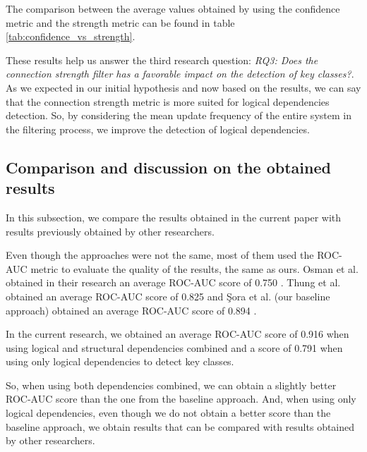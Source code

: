 \documentclass[runningheads]{comsis2}
\begin{document}
The comparison between the average values obtained by using the confidence metric and the strength metric can be found in table \ref{tab:confidence_vs_strength}.

These results help us answer the third research question: \textit{RQ3: Does the connection strength filter has a favorable impact on the detection of key classes?}. As we expected in our initial hypothesis and now based on the results, we can say that the connection strength metric is more suited for logical dependencies detection. So, by considering the mean update frequency of the entire system in the filtering process, we improve the detection of logical dependencies.

\subsection{ Comparison and discussion on the obtained results}
\label{sec:compare_others}
In this subsection, we compare the results obtained in the current paper with results previously obtained by other researchers. 

Even though the approaches were not the same, most of them used the ROC-AUC metric to evaluate the quality of the results, the same as ours.
Osman et al. obtained in their research an average ROC-AUC score of 0.750 \cite{6676885}. Thung et al. obtained an average ROC-AUC score of 0.825 \cite{rocclasification} and Şora et al. (our baseline approach) obtained an average ROC-AUC score of 0.894 \cite{Finding-key-classes}.

In the current research, we obtained an average ROC-AUC score of 0.916 when using logical and structural dependencies combined and a score of 0.791 when using only logical dependencies to detect key classes.

So, when using both dependencies combined, we can obtain a slightly better ROC-AUC score than the one from the baseline approach. And, when using only logical dependencies, even though we do not obtain a better score than the baseline approach, we obtain results that can be compared with results obtained by other researchers. 
\end{document}
